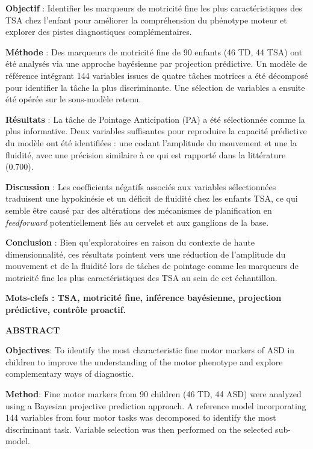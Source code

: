 \footnotesize{{\bf{Objectif}} : Identifier les marqueurs de motricité fine les plus caractéristiques des TSA chez l'enfant pour améliorer la compréhension du phénotype moteur et explorer des pistes diagnostiques complémentaires. 
	
{\bf{Méthode}} : Des marqueurs de motricité fine de 90 enfants (46 TD, 44 TSA) ont été analysés via une approche bayésienne par projection prédictive. Un modèle de référence intégrant 144 variables issues de quatre tâches motrices a été décomposé pour identifier la tâche la plus discriminante. Une sélection de variables a ensuite été opérée sur le sous-modèle retenu. 

{\bf{Résultats}} : La tâche de Pointage Anticipation (PA) a été sélectionnée comme la plus informative. Deux variables suffisantes pour reproduire la capacité prédictive du modèle ont été identifiées : une codant l'amplitude du mouvement et une la fluidité, avec une précision similaire à ce qui est rapporté dans la littérature (0.700).

{\bf{Discussion}} : Les coefficients négatifs associés aux variables sélectionnées traduisent une hypokinésie et un déficit de fluidité chez les enfants TSA, ce qui semble être causé par des altérations des mécanismes de planification en \textit{feedforward} potentiellement liés au cervelet et aux ganglions de la base. 

{\bf{Conclusion}} : Bien qu'exploratoires en raison du contexte de haute dimensionnalité, ces résultats pointent vers une réduction de l'amplitude du mouvement et de la fluidité lors de tâches de pointage comme les marqueurs de motricité fine les plus caractéristiques des TSA au sein de cet échantillon.

\medskip

{\bf{Mots-clefs : TSA, motricité fine, inférence bayésienne, projection prédictive, contrôle proactif. }}

\vspace{1.5\baselineskip}


\small{{\bf{ABSTRACT}}}

\footnotesize{{\bf{Objectives}}: To identify the most characteristic fine motor markers of ASD in children to improve the understanding of the motor phenotype and explore complementary ways of diagnostic.

{\bf{Method}}: Fine motor markers from 90 children (46 TD, 44 ASD) were analyzed using a Bayesian projective prediction approach. A reference model incorporating 144 variables from four motor tasks was decomposed to identify the most discriminant task. Variable selection was then performed on the selected sub-model. 
	
}}
